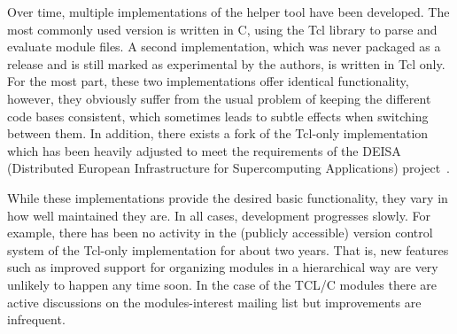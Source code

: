 Over time, multiple implementations of the helper tool
have been developed. The most commonly used version is written in C, using the Tcl
library to parse and evaluate module files. A second implementation, which
was never packaged as a release and is still marked as experimental by the
authors, is written in Tcl only. For the most part, these two implementations
offer identical functionality, however, they obviously suffer from the usual
problem of keeping the different code bases consistent, which sometimes leads
to subtle effects when switching between them. In addition, there exists a
fork of the Tcl-only implementation which has been heavily adjusted to meet
the requirements of the DEISA (Distributed European Infrastructure for
Supercomputing Applications) project~\cite{wikiDEISA}.



While these implementations provide the desired basic functionality, they
vary in how well maintained they are. In all cases, development
progresses slowly. For example, there has been no activity in the
(publicly accessible) version control system of the Tcl-only
implementation for about two years. That is, new features such as
improved support for organizing modules in a hierarchical way are very 
unlikely to happen any time soon. In the case of the TCL/C modules
there are active discussions on the modules-interest mailing list but
improvements are infrequent.




